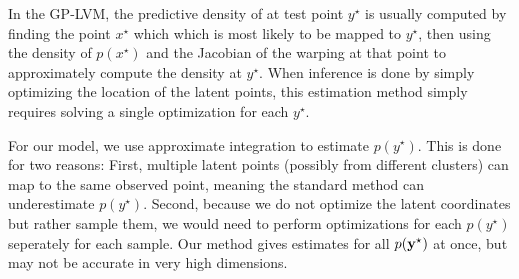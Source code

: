 In the GP-LVM, the predictive density of at test point $y^\star$ is usually computed by finding the point $x^\star$ which which is most likely to be mapped to $y^\star$, then using the density of $p(x^\star)$ and the Jacobian of the warping at that point to approximately compute the density at $y^\star$.  When inference is done by simply optimizing the location of the latent points, this estimation method simply requires solving a single optimization for each $y^\star$.  

For our model, we use approximate integration to estimate $p(y^\star)$.  This is done for two reasons: First, multiple latent points (possibly from different clusters) can map to the same observed point, meaning the standard method can underestimate $p(y^\star)$.  Second, because we do not optimize the latent coordinates but rather sample them, we would need to perform optimizations for each $p(y^\star)$ seperately for each sample.  Our method gives estimates for all $p({\bf{y}}^\star)$ at once, but may not be accurate in very high dimensions.

